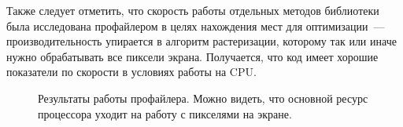 \documentclass{article}
\begin{document}
Также следует отметить, что скорость работы отдельных методов библиотеки была исследована профайлером в целях нахождения мест для оптимизации~--- производительность упирается в алгоритм растеризации, которому так или иначе нужно обрабатывать все пиксели экрана. Получается, что код имеет хорошие показатели по скорости в условиях работы на CPU.
\begin{center}
\begin{figure}[H]
\caption{Результаты работы профайлера. Можно видеть, что основной ресурс процессора уходит на работу с пикселями на экране.}
\label{ris:image}
\end{figure}
\end{center}





\end{document}
